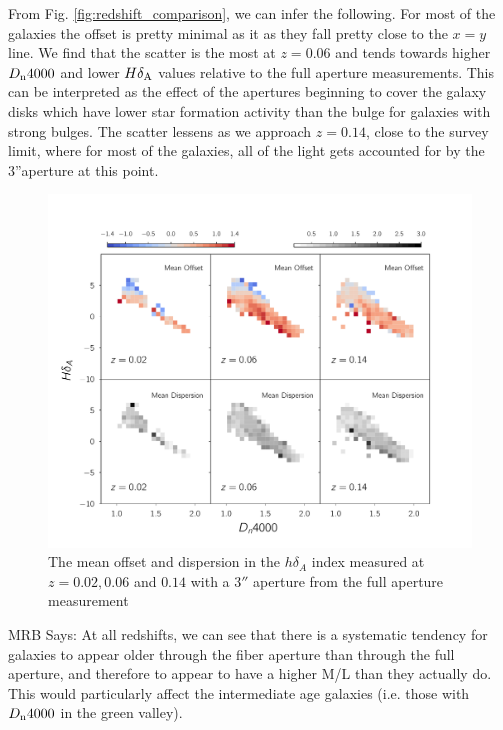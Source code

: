 From Fig. \ref{fig:redshift_comparison}, we can infer the following. For most of the galaxies the offset is pretty minimal as it as they fall pretty close to the $x=y$ line. We find that the scatter is the most at $z = 0.06$ and tends towards higher $D_{\rm n}4000$ and lower $H\delta_{\rm A}$ values relative to the full aperture measurements. This can be interpreted as the effect of the apertures beginning to cover the galaxy disks which have lower star formation activity than the bulge for galaxies with strong bulges. The scatter lessens as we approach $z = 0.14$, close to the survey limit, where for most of the galaxies, all of the light gets accounted for by the 3''aperture at this point.\\

\begin{figure}
\includegraphics[width=\textwidth]{figures/hdelta_full_aperture_comparisons.pdf}
\caption[The mean offset and dispersion in the $h\delta_{A}$ index measured at $z = 0.02,0.06$ and $0.14$ with a $3''$ aperture from the full aperture measurement ]{ The mean offset and dispersion in the $h\delta_{A}$ index measured at $z = 0.02,0.06$ and $0.14$ with a $3''$ aperture from the full aperture measurement 
\label{fig:offset_hdelta}}
\end{figure}

MRB Says: At all redshifts, we can see that there is a systematic tendency for galaxies to appear older through the fiber aperture than through the full aperture, and therefore to appear to have a higher M/L than they actually do. This would particularly affect the intermediate age galaxies (i.e. those with $D_{\rm n}4000$ in the green valley).\\


